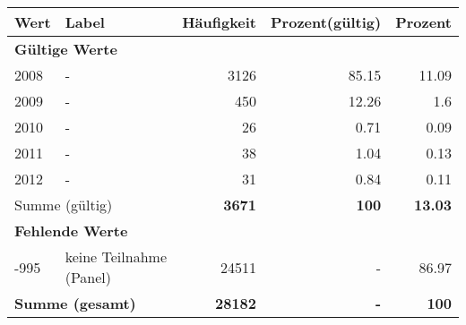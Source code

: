      \begin{longtable}{lXrrr}
     \toprule
     \textbf{Wert} & \textbf{Label} & \textbf{Häufigkeit} & \textbf{Prozent(gültig)} & \textbf{Prozent} \\
     \endhead
     \midrule
     \multicolumn{5}{l}{\textbf{Gültige Werte}}\\

     2008 &
     \multicolumn{1}{X}{ -  } &


       \num{3126} &
       \num[round-mode=places,round-precision=2]{85.15} &
         \num[round-mode=places,round-precision=2]{11.09} \\

     2009 &
     \multicolumn{1}{X}{ -  } &


       \num{450} &
       \num[round-mode=places,round-precision=2]{12.26} &
         \num[round-mode=places,round-precision=2]{1.6} \\

     2010 &
     \multicolumn{1}{X}{ -  } &


       \num{26} &
       \num[round-mode=places,round-precision=2]{0.71} &
         \num[round-mode=places,round-precision=2]{0.09} \\

     2011 &
     \multicolumn{1}{X}{ -  } &


       \num{38} &
       \num[round-mode=places,round-precision=2]{1.04} &
         \num[round-mode=places,round-precision=2]{0.13} \\

     2012 &
     \multicolumn{1}{X}{ -  } &


       \num{31} &
       \num[round-mode=places,round-precision=2]{0.84} &
         \num[round-mode=places,round-precision=2]{0.11} \\
     \midrule
     \multicolumn{2}{l}{Summe (gültig)} &
       \textbf{\num{3671}} &
     \textbf{100} &
       \textbf{\num[round-mode=places,round-precision=2]{13.03}} \\
     \multicolumn{5}{l}{\textbf{Fehlende Werte}}\\
       -995 &
       keine Teilnahme (Panel) &
         \num{24511} &
        - &
         \num[round-mode=places,round-precision=2]{86.97} \\
     \midrule
     \multicolumn{2}{l}{\textbf{Summe (gesamt)}} &
          \textbf{\num{28182}} &
        \textbf{-} &
        \textbf{100} \\
     \bottomrule
     \end{longtable}
     
